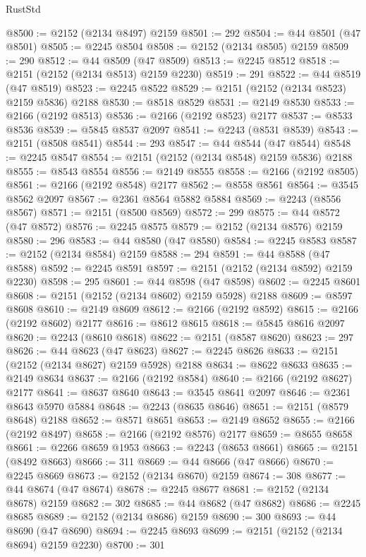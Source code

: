 \begin{lexlean}{RustStd}
\begin{coremodule}
@8500 := @2152 (@2134 @8497) @2159
@8501 := 292
@8504 := @44 @8501 (@47 @8501)
@8505 := @2245 @8504
@8508 := @2152 (@2134 @8505) @2159
@8509 := 290
@8512 := @44 @8509 (@47 @8509)
@8513 := @2245 @8512
@8518 := @2151 (@2152 (@2134 @8513) @2159 @2230)
@8519 := 291
@8522 := @44 @8519 (@47 @8519)
@8523 := @2245 @8522
@8529 := @2151 (@2152 (@2134 @8523) @2159 @5836) @2188
@8530 := @8518 @8529
@8531 := @2149 @8530
@8533 := @2166 (@2192 @8513)
@8536 := @2166 (@2192 @8523) @2177
@8537 := @8533 @8536
@8539 := @5845 @8537 @2097
@8541 := @2243 (@8531 @8539)
@8543 := @2151 (@8508 @8541)
@8544 := 293
@8547 := @44 @8544 (@47 @8544)
@8548 := @2245 @8547
@8554 := @2151 (@2152 (@2134 @8548) @2159 @5836) @2188
@8555 := @8543 @8554
@8556 := @2149 @8555
@8558 := @2166 (@2192 @8505)
@8561 := @2166 (@2192 @8548) @2177
@8562 := @8558 @8561
@8564 := @3545 @8562 @2097
@8567 := @2361 @8564 @5882 @5884
@8569 := @2243 (@8556 @8567)
@8571 := @2151 (@8500 @8569)
@8572 := 299
@8575 := @44 @8572 (@47 @8572)
@8576 := @2245 @8575
@8579 := @2152 (@2134 @8576) @2159
@8580 := 296
@8583 := @44 @8580 (@47 @8580)
@8584 := @2245 @8583
@8587 := @2152 (@2134 @8584) @2159
@8588 := 294
@8591 := @44 @8588 (@47 @8588)
@8592 := @2245 @8591
@8597 := @2151 (@2152 (@2134 @8592) @2159 @2230)
@8598 := 295
@8601 := @44 @8598 (@47 @8598)
@8602 := @2245 @8601
@8608 := @2151 (@2152 (@2134 @8602) @2159 @5928) @2188
@8609 := @8597 @8608
@8610 := @2149 @8609
@8612 := @2166 (@2192 @8592)
@8615 := @2166 (@2192 @8602) @2177
@8616 := @8612 @8615
@8618 := @5845 @8616 @2097
@8620 := @2243 (@8610 @8618)
@8622 := @2151 (@8587 @8620)
@8623 := 297
@8626 := @44 @8623 (@47 @8623)
@8627 := @2245 @8626
@8633 := @2151 (@2152 (@2134 @8627) @2159 @5928) @2188
@8634 := @8622 @8633
@8635 := @2149 @8634
@8637 := @2166 (@2192 @8584)
@8640 := @2166 (@2192 @8627) @2177
@8641 := @8637 @8640
@8643 := @3545 @8641 @2097
@8646 := @2361 @8643 @5970 @5884
@8648 := @2243 (@8635 @8646)
@8651 := @2151 (@8579 @8648) @2188
@8652 := @8571 @8651
@8653 := @2149 @8652
@8655 := @2166 (@2192 @8497)
@8658 := @2166 (@2192 @8576) @2177
@8659 := @8655 @8658
@8661 := @2266 @8659 @1953
@8663 := @2243 (@8653 @8661)
@8665 := @2151 (@8492 @8663)
@8666 := 311
@8669 := @44 @8666 (@47 @8666)
@8670 := @2245 @8669
@8673 := @2152 (@2134 @8670) @2159
@8674 := 308
@8677 := @44 @8674 (@47 @8674)
@8678 := @2245 @8677
@8681 := @2152 (@2134 @8678) @2159
@8682 := 302
@8685 := @44 @8682 (@47 @8682)
@8686 := @2245 @8685
@8689 := @2152 (@2134 @8686) @2159
@8690 := 300
@8693 := @44 @8690 (@47 @8690)
@8694 := @2245 @8693
@8699 := @2151 (@2152 (@2134 @8694) @2159 @2230)
@8700 := 301

\end{coremodule}
\end{lexlean}

